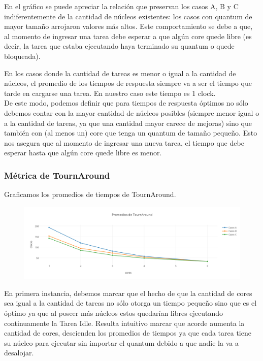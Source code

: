 \documentclass[a4paper]{article}
\begin{document}
 En el gr\'afico se puede apreciar la relaci\'on que preservan los casos A, B y C indiferentemente de la cantidad de n\'ucleos existentes: los casos con quantum de mayor tama\~no arrojaron valores m\'as altos. Este comportamiento se debe a que, al momento de ingresar una tarea debe esperar a que alg\'un core quede libre (es decir, la tarea que estaba ejecutando haya terminado su quantum o quede bloqueada).
 
 En los casos donde la cantidad de tareas es menor o igual a la cantidad de n\'ucleos, el promedio de los tiempos de respuesta siempre va a ser el tiempo que tarde en cargarse una tarea. En nuestro caso este tiempo es 1 clock.\\
 
 De este modo, podemos definir que para tiempos de respuesta \'optimos no s\'olo debemos contar con la mayor cantidad de n\'ucleos posibles (siempre menor igual o a la cantidad de tareas, ya que una cantidad mayor carece de mejoras) sino que tambi\'en con (al menos un) core que tenga un quantum de tama\~no peque\~no. Esto nos asegura que al momento de ingresar una nueva tarea, el tiempo que debe esperar hasta que alg\'un core quede libre es menor.

\newpage

\subsubsection*{M\'etrica de TournAround}
Graficamos los promedios de tiempos de TournAround.

 		 \begin{figure}[h!]
   \begin{center}
 	\includegraphics[scale=1.2]{imagenes/ej7/TiemposTournAround.png}
   \end{center}
 \end{figure} 
 
En primera instancia, debemos marcar que el hecho de que la cantidad de cores sea igual a la cantidad de tareas no s\'olo otorga un tiempo peque\~no sino que es el \'optimo ya que al poseer m\'as n\'ucleos estos quedar\'ian libres ejecutando continuamente la Tarea Idle. Resulta intuitivo marcar que acorde aumenta la cantidad de cores, descienden los promedios de tiempos ya que cada tarea tiene su n\'ucleo para ejecutar sin importar el quantum debido a que nadie la va a desalojar.\\
\end{document}
